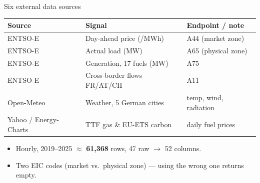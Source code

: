 \documentclass[aspectratio=169,11pt]{beamer}
\newcommand{\actname}{}
\newcommand{\actcolor}{emisAccent}
\newcommand{\setact}[2]{\renewcommand{\actname}{#1}\renewcommand{\actcolor}{#2}}
\newcommand{\eur}{\texteuro}
\begin{document}
\setact{Data}{emisAccent}
\begin{frame}{Six external data sources}
  \centering
  \footnotesize
  \begin{tabular}{@{}l l l@{}}
    \toprule
    \textbf{Source} & \textbf{Signal} & \textbf{Endpoint / note}\\
    \midrule
    ENTSO-E & Day-ahead price (\eur/MWh) & A44 (market zone)\\
    ENTSO-E & Actual load (MW) & A65 (physical zone)\\
    ENTSO-E & Generation, 17 fuels (MW) & A75\\
    ENTSO-E & Cross-border flows FR/AT/CH & A11\\
    Open-Meteo & Weather, 5 German cities & temp, wind, radiation\\
    Yahoo / Energy-Charts & TTF gas \& EU-ETS carbon & daily fuel prices\\
    \bottomrule
  \end{tabular}
  \vspace{0.35cm}
  \begin{itemize}\setlength\itemsep{2pt}
    \item Hourly, 2019--2025 \;$\approx$\; \textbf{61{,}368} rows, 47 raw $\rightarrow$ 52 columns.
    \item Two EIC codes (market vs.\ physical zone) --- using the wrong one returns empty.
  \end{itemize}
\end{frame}
\end{document}
